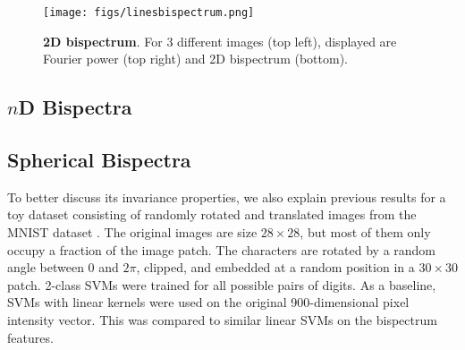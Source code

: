 \documentclass[letterpaper, 10pt]{article}
\theoremstyle{definition}
\begin{document}
\begin{figure}
 \begin{center}
   \texttt{[image: figs/linesbispectrum.png]} 
\caption{\textbf{2D bispectrum}. For 3 different images (top left), displayed are Fourier power (top right) and 2D bispectrum (bottom).}
\label{bispetrum_2dex}
\end{center}
\end{figure}

\subsection{$n$D Bispectra}

\subsection{Spherical Bispectra}

To better discuss its invariance properties, we also explain previous results \cite{kondor2007complete} for a toy dataset consisting of randomly rotated and translated images from the MNIST dataset \cite{lecun1998mnist}.  The original images are size $28\times 28$, but most of them only occupy a fraction of the image patch. The characters are rotated by a random angle between 0 and $2\pi$, clipped, and embedded at a random position in a $30\times 30$ patch.  2-class SVMs were trained for all possible pairs of digits. As a baseline, SVMs with linear kernels were used on the original 900-dimensional pixel intensity vector.  This was compared to similar linear SVMs on the bispectrum features. 
\end{document}
